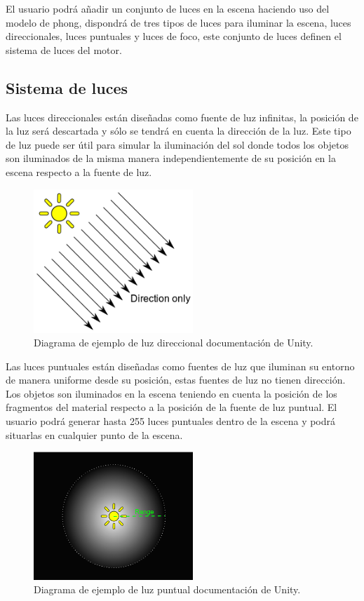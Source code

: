 \documentclass[a4paper]{book}
\begin{document}
El usuario podrá añadir un conjunto de luces en la escena haciendo uso del modelo de phong, dispondrá de tres tipos de luces para
iluminar la escena, luces direccionales, luces puntuales y luces de foco, este conjunto de luces definen el sistema de luces del motor.

\subsection{Sistema de luces}
\label{sec:Luces}

Las luces direccionales están diseñadas como fuente de luz infinitas, la posición de la luz será descartada y sólo se tendrá en cuenta
la dirección de la luz. Este tipo de luz puede ser útil para simular la iluminación del sol donde todos los objetos son iluminados de
la misma manera independientemente de su posición en la escena respecto a la fuente de luz.

\begin{figure}[H]
    \centering
    \includegraphics[width=6cm, keepaspectratio]{img/DirectionalLightDiagram.png}
    \caption{ Diagrama de ejemplo de luz direccional documentación de Unity.}
    \label{DirectionalLightDiagram}
\end{figure}

Las luces puntuales están diseñadas como fuentes de luz que iluminan su entorno de manera uniforme desde su posición, estas fuentes de
luz no tienen dirección. Los objetos son iluminados en la escena teniendo en cuenta la posición de los fragmentos del material respecto
a la posición de la fuente de luz puntual. El usuario podrá generar hasta 255 luces puntuales dentro de la escena y podrá situarlas en
cualquier punto de la escena.

\begin{figure}[H]
    \centering
    \includegraphics[width=6cm, keepaspectratio]{img/PointLightDiagram.png}
    \caption{Diagrama de ejemplo de luz puntual documentación de Unity.}
    \label{PointLightDiagram}
\end{figure}
\end{document}
